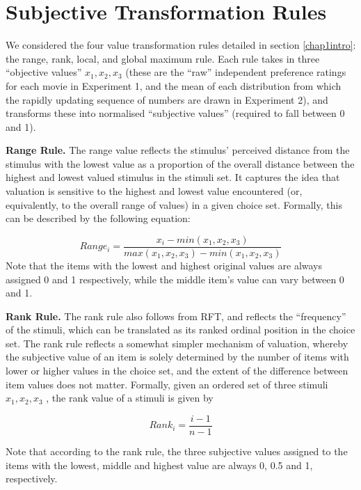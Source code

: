 \documentclass[11pt,a4paper]{article}
\begin{document}
\section{Subjective Transformation Rules} \label{chap1subjtrexplained}

We considered the four value transformation rules detailed in section \ref{chap1intro}: the range, rank, local, and global maximum rule. Each rule takes in three “objective values” $x_1, x_2, x_3$  (these are the “raw” independent preference ratings for each movie in Experiment 1, and the mean of each distribution from which the rapidly updating sequence of numbers are drawn in Experiment 2), and transforms these into normalised “subjective values” (required to fall between 0 and 1). 

 \textbf{Range Rule.} The range value reflects the stimulus' perceived distance from the stimulus with the lowest value as a proportion of the overall distance between the highest and lowest valued stimulus in the stimuli set. It captures the idea that valuation is sensitive to the highest and lowest value encountered (or, equivalently, to the overall range of values) in a given choice set. Formally, this can be described by the following equation:
 
\begin{equation}
Range_{i}=\frac{x_i - min(x_1,x_2,x_3)}{max(x_1,x_2,x_3)-min(x_1,x_2,x_3)}
\label{eq:range}
\end{equation}
 Note that the items with the lowest and highest original values are always assigned 0 and 1 respectively, while the middle item's value can vary between 0 and 1.
 
 
 \textbf{Rank Rule.} The rank rule also follows from RFT, and reflects the “frequency” of the stimuli, which can be translated as its ranked ordinal position in the choice set. The rank rule reflects a somewhat simpler mechanism of valuation, whereby the subjective value of an item is solely determined by the number of items with lower or higher values in the choice set, and the extent of the difference between item values does not matter. Formally, given an ordered set of three stimuli $x_1, x_2, x_3$ , the rank value of a stimuli is given by
 
\begin{equation}
Rank_{i}=\frac{i-1}{n-1}
\label{eq:rank}
\end{equation}

Note that according to the rank rule, the three subjective values assigned to the items with the lowest, middle and highest value are always 0, 0.5 and 1, respectively.
\end{document}
